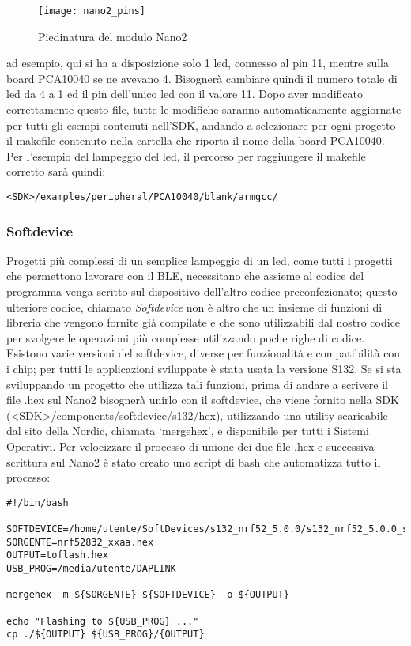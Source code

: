 \begin{figure}[H]
\texttt{[image: nano2\_pins]}
\centering
\caption{Piedinatura del modulo Nano2}
\label{nano2_pins}
\end{figure}
ad esempio, qui si ha a disposizione solo 1 led, connesso al pin 11, mentre sulla board PCA10040 se ne avevano 4. Bisognerà cambiare quindi il numero totale di led da 4 a 1 ed il pin dell'unico led con il valore 11.
Dopo aver modificato correttamente questo file, tutte le modifiche saranno automaticamente aggiornate per tutti gli esempi contenuti nell'SDK, andando a selezionare per ogni progetto il makefile contenuto nella cartella che riporta il nome della board PCA10040.
Per l'esempio del lampeggio del led, il percorso per raggiungere il makefile corretto sarà quindi:

\begin{verbatim}
<SDK>/examples/peripheral/PCA10040/blank/armgcc/
\end{verbatim}

\subsubsection{Softdevice}
Progetti più complessi di un semplice lampeggio di un led, come tutti i progetti che permettono lavorare con il BLE, necessitano che assieme al codice del programma venga scritto sul dispositivo dell'altro codice preconfezionato; questo ulteriore codice, chiamato \emph{Softdevice} non è altro che un insieme di funzioni di libreria che vengono fornite già compilate e che sono utilizzabili dal nostro codice per svolgere le operazioni più complesse utilizzando poche righe di codice. Esistono varie versioni del softdevice, diverse per funzionalità e compatibilità con i chip; per tutti le applicazioni sviluppate è stata usata la versione S132.
Se si sta sviluppando un progetto che utilizza tali funzioni, prima di andare a scrivere il file .hex sul Nano2 bisognerà unirlo con il softdevice, che viene fornito nella SDK (<SDK>/components/softdevice/s132/hex), utilizzando una utility scaricabile dal sito della Nordic, chiamata \lq mergehex\rq, e disponibile per tutti i Sistemi Operativi.
Per velocizzare il processo di unione dei due file .hex e successiva scrittura sul Nano2 è stato creato uno script di bash che automatizza tutto il processo:

\begin{verbatim}
#!/bin/bash

SOFTDEVICE=/home/utente/SoftDevices/s132_nrf52_5.0.0/s132_nrf52_5.0.0_softdevice.hex
SORGENTE=nrf52832_xxaa.hex 
OUTPUT=toflash.hex
USB_PROG=/media/utente/DAPLINK

mergehex -m ${SORGENTE} ${SOFTDEVICE} -o ${OUTPUT}

echo "Flashing to ${USB_PROG} ..."
cp ./${OUTPUT} ${USB_PROG}/{OUTPUT}
\end{verbatim}

